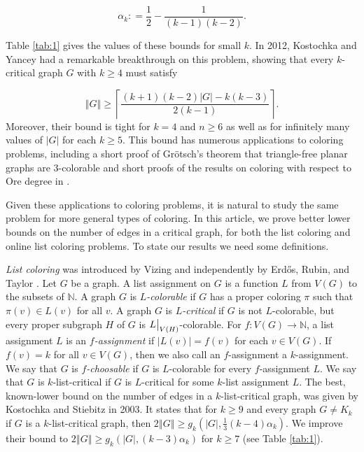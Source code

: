 \documentclass[12pt]{article}
\theoremstyle{plain}
\theoremstyle{definition}
\theoremstyle{remark}
\newcommand{\IN}{\mathbb{N}}
\newcommand{\card}[1]{\left|#1\right|}
\newcommand{\size}[1]{\left\Vert#1\right\Vert}
\newcommand{\ceil}[1]{\left\lceil#1\right\rceil}
\newcommand{\func}[3]{#1\colon #2 \rightarrow #3}
\newcommand{\DefinedAs}{\mathrel{\mathop:}=}
\newcommand\restr[2]{{%
  \left.\kern-\nulldelimiterspace %
  #1 %
  \vphantom{\big|} %
  \right|_{#2} %
  }}
\begin{document}
\[\alpha_k \DefinedAs \frac12 - \frac{1}{(k-1)(k-2)}.\]

Table \ref{tab:1} gives the values of these bounds for small $k$.  In 2012, Kostochka and Yancey \cite{kostochkayancey2012ore} had a remarkable breakthrough on this problem, showing that every $k$-critical graph $G$ with $k \ge 4$ must satisfy

\[\size{G} \ge \ceil{\frac{(k+1)(k-2)\card{G} - k(k-3)}{2(k-1)}}.\]
Moreover, their bound is tight for $k=4$ and $n \ge 6$ as well as for infinitely many values of $\card{G}$ for each $k \ge 5$.  This bound has numerous applications to coloring problems, including a short proof of Gr\"otsch's theorem that triangle-free planar graphs are $3$-colorable \cite{kostochka2012oregrotsch} and short proofs of the results on coloring with respect to Ore degree in \cite{kierstead2009ore, rabern2010a, krs_one}. 

Given these applications to coloring problems, it is natural to study the same problem for more general types of coloring.  In this article, we prove better lower bounds on the number of edges in a critical graph, for both the list coloring and online list coloring problems.  To state our results we need some definitions.

\emph{List coloring} was introduced by Vizing \cite{vizing1976} and independently by Erd\H{o}s, Rubin, and Taylor \cite{erdos1979choosability}.  Let $G$ be a graph. A list assignment on $G$ is a function $L$ from $V(G)$ to the subsets of $\IN$.   A graph $G$ is \emph{$L$-colorable} if $G$ has a proper coloring $\pi$ such that $\pi(v)\in L(v)$ for all $v$.   A graph $G$ is \emph{$L$-critical} if $G$ is not $L$-colorable, but every proper subgraph $H$ of $G$ is $\restr{L}{V(H)}$-colorable. For $\func{f}{V(G)}{\IN}$, a list assignment $L$ is an \emph{$f$-assignment} if $\card{L(v)} = f(v)$ for each $v \in V(G)$.  If $f(v) = k$ for all $v \in V(G)$, then we also call an $f$-assignment a $k$-assignment.  We say that $G$ is \emph{$f$-choosable} if $G$ is $L$-colorable for every $f$-assignment $L$.  
We say that $G$ is $k$-list-critical if $G$ is $L$-critical for some $k$-list assignment $L$. %
The best, known-lower bound on the number of edges in a $k$-list-critical graph, was given by Kostochka and Stiebitz \cite{kostochkastiebitzedgesincriticalgraph} in 2003. %
It states that for $k \ge 9$ and every graph $G \ne K_k$ if $G$ is a $k$-list-critical graph, then $2\size{G} \ge g_k(\card{G}, \frac13 (k-4)\alpha_k)$.  We improve their bound to $2\size{G} \ge g_k(\card{G}, (k-3)\alpha_k)$ for $k\ge7$ (see Table \ref{tab:1}).
\end{document}
